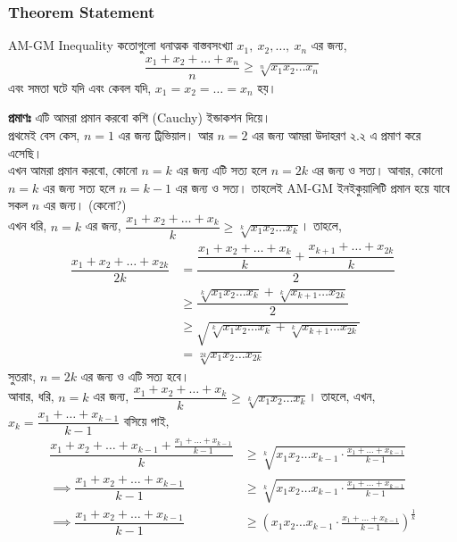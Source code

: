 \documentclass[12pt]{article}
\begin{document}
\subsubsection{Theorem Statement}
\begin{theom} {AM-GM Inequality}
    কতোগুলো ধনাত্মক বাস্তবসংখ্যা $x_1, \ x_2, \dots,\ x_n$ এর জন্য, 
    $$\dfrac{x_1+x_2+\dots + x_n}{n} \geq \sqrt[n]{x_1x_2\dots x_n}$$
    এবং সমতা ঘটে যদি এবং কেবল যদি, $x_1 = x_2 = \dots = x_n$ হয়।
\end{theom}
\begin{sol}
    \textbf{প্রমাণঃ} এটি আমরা প্রমান করবো কশি (Cauchy) ইন্ডাকশন দিয়ে। \\
    প্রথমেই বেস কেস, $n = 1$ এর জন্য ট্রিভিয়াল। আর $n = 2$ এর জন্য আমরা উদাহরণ ২.২ এ প্রমাণ করে এসেছি।\\
    এখন আমরা প্রমান করবো, কোনো $n = k$ এর জন্য এটি সত্য হলে $n = 2k$ এর জন্য ও সত্য। 
    আবার, কোনো $n = k$ এর জন্য সত্য হলে $n = k-1$ এর জন্য ও সত্য। তাহলেই AM-GM ইনইকুয়ালিটি প্রমান হয়ে যাবে
    সকল $n$ এর জন্য। (কেনো?) \\
    এখন ধরি, $n = k$ এর জন্য, $\dfrac{x_1+x_2+\dots + x_k}{k} \geq \sqrt[k]{x_1x_2\dots x_k}$। তাহলে,
    \begin{align*}
        \dfrac{x_1+x_2+\dots + x_{2k}}{2k} &= \dfrac{\dfrac{x_1+x_2+\dots + x_k}{k} + \dfrac{x_{k+1}+\dots + x_{2k}}{k}}{2}\\
        &\geq \dfrac{\sqrt[k]{x_1x_2\dots x_k} + \sqrt[k]{x_{k+1}\dots  x_{2k}}}{2}\\
        &\geq \sqrt{\sqrt[k]{x_1x_2\dots x_k} + \sqrt[k]{x_{k+1}\dots  x_{2k}}}\\
        &= \sqrt[2k]{x_1x_2\dots  x_{2k}}
    \end{align*}
    সুতরাং, $n = 2k$ এর জন্য ও এটি সত্য হবে।\\
    আবার, ধরি, $n = k$ এর জন্য, $\dfrac{x_1+x_2+\dots + x_k}{k} \geq \sqrt[k]{x_1x_2\dots x_k}$। তাহলে,
    এখন, $x_k = \dfrac{x_1+\dots + x_{k-1}}{k-1}$ বসিয়ে পাই,
    \begin{align*}
        \dfrac{x_1+x_2+\dots +x_{k-1} +\frac{x_1+\dots + x_{k-1}}{k-1}}{k} &\geq \sqrt[k]{x_1x_2\dots x_{k-1}\cdot \frac{x_1+\dots + x_{k-1}}{k-1}}\\
        \implies \dfrac{x_1+x_2+\dots +x_{k-1}}{k-1} &\geq \sqrt[k]{x_1x_2\dots x_{k-1}\cdot \frac{x_1+\dots + x_{k-1}}{k-1}}\\
        \implies \dfrac{x_1+x_2+\dots +x_{k-1}}{k-1} &\geq \left(x_1x_2\dots x_{k-1}\cdot \frac{x_1+\dots + x_{k-1}}{k-1}\right)^\frac{1}{k}\\

\end{align*}
\end{sol}
\end{document}
